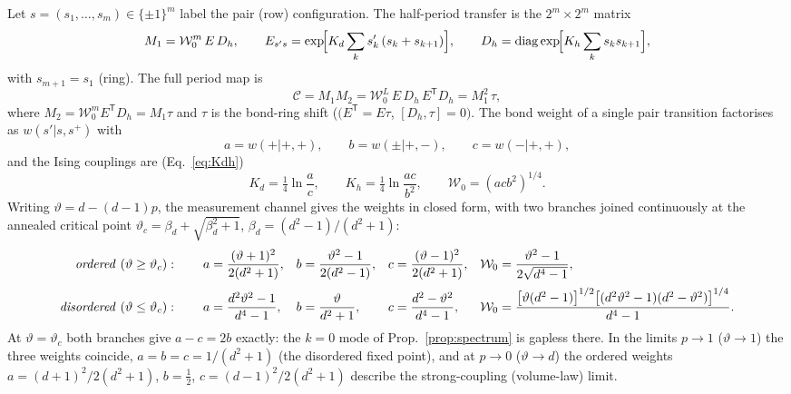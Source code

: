 \documentclass[11pt]{article}
\newcommand{\vth}{\vartheta}
\newcommand{\Ccomp}{\mathcal{C}}
\newcommand{\Wz}{\mathcal{W}_0}
\begin{document}
Let $s=(s_1,\dots,s_m)\in\{\pm1\}^m$ label the pair (row) configuration.
The half-period transfer is the $2^m\times2^m$ matrix
\begin{equation}
  M_1=\Wz^m\,E\,D_h,\qquad
  E_{s's}=\exp\!\Bigl[K_d\sum_k s'_k\,(s_k+s_{k+1})\Bigr],\qquad
  D_h=\operatorname{diag}\exp\!\Bigl[K_h\sum_k s_k s_{k+1}\Bigr],
  \label{eq:M1M2}
\end{equation}
with $s_{m+1}=s_1$ (ring).  The full period map is
\begin{equation}
  \Ccomp=M_1M_2=\Wz^L\,E\,D_h\,E^{\mathsf T}D_h
       =M_1^2\,\tau,
  \label{eq:periodmap}
\end{equation}
where $M_2=\Wz^mE^{\mathsf T}D_h=M_1\tau$ and $\tau$ is the bond-ring shift
($(E^{\mathsf T}=E\tau$, $[D_h,\tau]=0)$.  The bond weight of a single pair
transition factorises as $w(s'|s,s^+)$ with
\begin{equation}
  a=w(+|+,+),\qquad b=w(\pm|+,-),\qquad c=w(-|+,+),
  \label{eq:weights}
\end{equation}
and the Ising couplings are (Eq.~\ref{eq:Kdh})
\begin{equation}
  K_d=\tfrac14\ln\frac{a}{c},\qquad
  K_h=\tfrac14\ln\frac{ac}{b^2},\qquad
  \Wz=(acb^2)^{1/4}.
  \label{eq:Kdh}
\end{equation}
Writing $\vth=d-(d-1)p$, the measurement channel gives the weights in closed
form, with two branches joined continuously at the annealed critical point
$\vth_c=\beta_d+\sqrt{\beta_d^2+1}$, $\beta_d=(d^2-1)/(d^2+1)$:
\begin{align}
  \text{\emph{ordered}}\ (\vth\ge\vth_c):\qquad
  a&=\frac{(\vth+1)^2}{2(d^2+1)},& b&=\frac{\vth^2-1}{2(d^2-1)},&
  c&=\frac{(\vth-1)^2}{2(d^2+1)},&
  \Wz&=\frac{\vth^2-1}{2\sqrt{d^4-1}},
  \label{eq:wordered}\\[2pt]
  \text{\emph{disordered}}\ (\vth\le\vth_c):\qquad
  a&=\frac{d^2\vth^2-1}{d^4-1},& b&=\frac{\vth}{d^2+1},&
  c&=\frac{d^2-\vth^2}{d^4-1},&
  \Wz&=\frac{\bigl[\vth(d^2-1)\bigr]^{1/2}
        \bigl[(d^2\vth^2-1)(d^2-\vth^2)\bigr]^{1/4}}{d^4-1}.
  \label{eq:wdisordered}
\end{align}
At $\vth=\vth_c$ both branches give $a-c=2b$ exactly: the $k=0$ mode of
Prop.~\ref{prop:spectrum} is gapless there.  In the limits $p\to1$
($\vth\to1$) the three weights coincide, $a=b=c=1/(d^2+1)$ (the disordered
fixed point), and at $p\to0$ ($\vth\to d$) the ordered weights
$a=(d+1)^2/2(d^2+1)$, $b=\tfrac12$, $c=(d-1)^2/2(d^2+1)$ describe the
strong-coupling (volume-law) limit.
\end{document}

